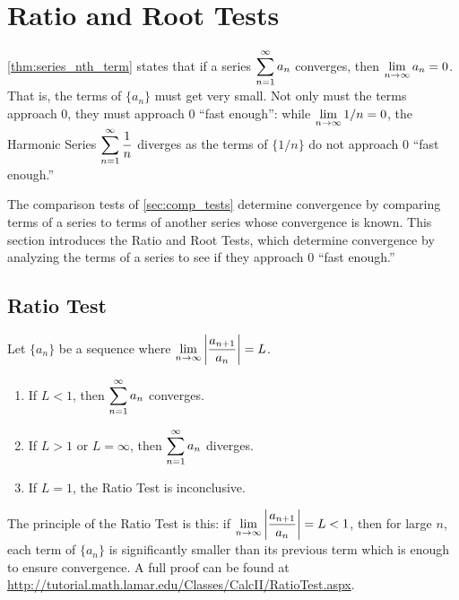 \section{Ratio and Root Tests}\label{sec:ratio_root_tests}

\autoref{thm:series_nth_term} states that if a series $\displaystyle\sum_{n=1}^\infty a_n$ converges, then $\displaystyle \lim_{n\to \infty} a_n =0$. That is, the terms of $\{a_n\}$ must get very small. Not only must the terms approach 0, they must approach 0 ``fast enough'': while $\displaystyle \lim_{n\to\infty}1/n=0$, the Harmonic Series $\displaystyle\sum_{n=1}^\infty \frac1n$ diverges as the terms of $\{1/n\}$ do not approach 0 ``fast enough.''

The comparison tests of \autoref{sec:comp_tests} determine convergence by comparing terms of a series to terms of another series whose convergence is known. This section introduces the Ratio and Root Tests, which determine convergence by analyzing the terms of a series to see if they approach 0 ``fast enough.''

\subsection{Ratio Test}

\begin{theorem}\label{thm:ratio_test}%
Let $\{a_n\}$ be a sequence where $\displaystyle \lim_{n\to\infty}\left\lvert \frac{a_{n+1}}{a_n} \right\rvert = L$.%
%
\begin{enumerate}
	\item If $L<1$, then $\displaystyle\sum_{n=1}^\infty a_n$ converges.
	\item If $L>1$ or $L=\infty$, then $\displaystyle\sum_{n=1}^\infty a_n$ diverges.
	\item If $L=1$, the Ratio Test is inconclusive.
\end{enumerate}
\end{theorem}


The principle of the Ratio Test is this: if $\displaystyle\lim_{n\to\infty}\left\lvert \frac{a_{n+1}}{a_n} \right\rvert = L<1$, then for large $n$, each term of $\{a_n\}$ is significantly smaller than its previous term which is enough to ensure convergence.  A full proof can be found at \url{http://tutorial.math.lamar.edu/Classes/CalcII/RatioTest.aspx}.

